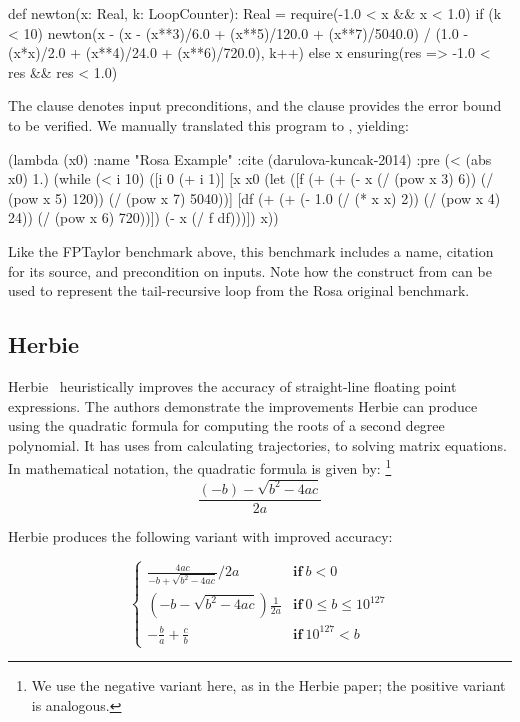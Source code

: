 \documentclass[main.tex]{subfiles}
\begin{document}
\begin{code}
def newton(x: Real, k: LoopCounter): Real = {
  require(-1.0 < x && x < 1.0)
  if (k < 10) {
    newton(x - (x - (x**3)/6.0 + (x**5)/120.0 + (x**7)/5040.0) / 
      (1.0 - (x*x)/2.0 + (x**4)/24.0 + (x**6)/720.0), k++)
  } else {
    x
  }
} ensuring(res => -1.0 < res && res < 1.0)
\end{code}

The  clause denotes input preconditions, and the
 clause provides the error bound to be verified. We manually
translated this program to \core, yielding:

\begin{code}
(lambda (x0)
  :name "Rosa Example"
  :cite (darulova-kuncak-2014)
  :pre (< (abs x0) 1.)
  (while (< i 10)
    ([i 0 (+ i 1)]
     [x x0
      (let ([f (+ (+ (- x (/ (pow x 3) 6))
                     (/ (pow x 5) 120)) (/ (pow x 7) 5040))]
            [df (+ (+ (- 1.0 (/ (* x x) 2)) 
                      (/ (pow x 4) 24)) (/ (pow x 6) 720))])
        (- x (/ f df)))])
    x))
\end{code}

Like the FPTaylor benchmark above, this benchmark includes a name,
  citation for its source, and precondition on inputs.
Note how the  construct from \core
  can be used to represent the tail-recursive loop
  from the Rosa original benchmark.

\subsection{Herbie}

Herbie~\cite{pavel15} heuristically improves the accuracy of straight-line
floating point expressions.  The authors demonstrate the improvements
Herbie can produce using the quadratic formula for computing the roots of a
second degree polynomial.  It has uses from calculating trajectories, to
solving matrix equations.  In mathematical notation, the quadratic formula
is given by:
%
\footnote{We use the negative variant here, as in the Herbie paper;
  the positive variant is analogous.}
%
\begin{equation*}
  \frac{(- b) - \sqrt{b^2 - 4ac}}{2a}
\end{equation*}

\noindent Herbie produces the following variant with improved accuracy:

\newcommand{\K}[1]{\mathbf{#1}\:}

\begin{equation*}
\begin{cases}
  \frac{4ac}{-b + \sqrt{b^2 - 4ac}}/2a & \K{if} b < 0 \\[9pt]
  \left(-b - \sqrt{b^2 - 4ac}\right)\frac1{2a} & \K{if} 0 \le b \le 10^{127} \\[5pt]
  -\frac{b}{a} + \frac{c}{b} & \K{if} 10^{127} < b
\end{cases}
\end{equation*}
\end{document}
